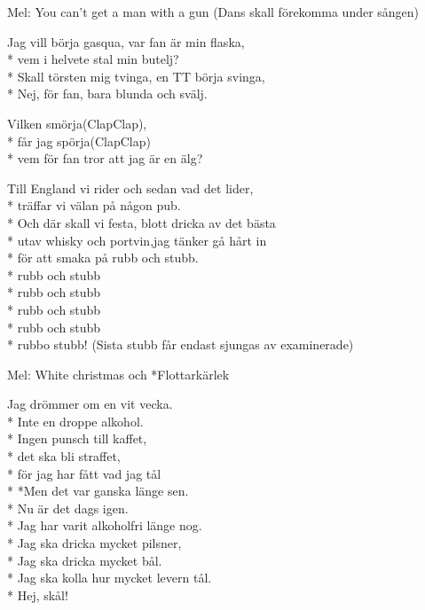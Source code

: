 \begin{SongText}
    \begin{SongInfo}
        Mel: You can’t get a man with a gun
        (Dans skall förekomma under sången)
    \end{SongInfo}
    \begin{SongVerse}
        Jag vill börja gasqua, var fan är min flaska,\\*%
        vem i helvete stal min butelj?\\*%
        Skall törsten mig tvinga, en TT börja svinga,\\*%
        Nej, för fan, bara blunda och svälj.
    \end{SongVerse}
    \begin{SongVerse}
        Vilken smörja(ClapClap),\\*%
        får jag spörja(ClapClap)\\*%
        vem för fan tror att jag är en älg?
    \end{SongVerse}
    \begin{SongVerse}
        Till England vi rider och sedan vad det lider,\\*%
        träffar vi välan på någon pub.\\*%
        Och där skall vi festa, blott dricka av det bästa\\*%
        utav whisky och portvin,jag tänker gå hårt in\\*%
        för att smaka på rubb och stubb.\\*%
        rubb och stubb\\*%
        rubb och stubb\\*%
        rubb och stubb\\*%
        rubb och stubb\\*%
        rubbo stubb! (Sista stubb får endast sjungas av 
        examinerade)
    \end{SongVerse}
\end{SongText}
\begin{SongText}
    \begin{SongInfo}
        Mel: White christmas och *Flottarkärlek
    \end{SongInfo}
    \begin{SongVerse}
        Jag drömmer om en vit vecka.\\*%
        Inte en droppe alkohol.\\*%
        Ingen punsch till kaffet,\\*%
        det ska bli straffet,\\*%
        för jag har fått vad jag tål\\*%
        *Men det var ganska länge sen.\\*%
        Nu är det dags igen.\\*%
        Jag har varit alkoholfri länge nog.\\*%
        Jag ska dricka mycket pilsner,\\*%
        Jag ska dricka mycket bål.\\*%
        Jag ska kolla hur mycket levern tål.\\*%
        Hej, skål!
    \end{SongVerse}
\end{SongText}

